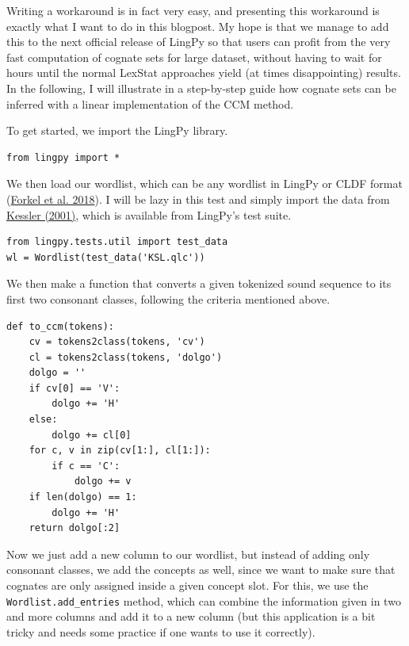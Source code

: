 \documentclass[
  a4paper,
  14pt,
  oneside,
  tablecaptionabove
]{scrbook}
\begin{document}
Writing a workaround is in fact very easy, and presenting this
workaround is exactly what I want to do in this blogpost. My hope is
that we manage to add this to the next official release of LingPy so
that users can profit from the very fast computation of cognate sets for
large dataset, without having to wait for hours until the normal LexStat
approaches yield (at times disappointing) results. In the following, I
will illustrate in a step-by-step guide how cognate sets can be inferred
with a linear implementation of the CCM method.

To get started, we import the LingPy library.

\begin{lstlisting}[basicstyle=\small]
from lingpy import *
\end{lstlisting}

We then load our wordlist, which can be any wordlist in LingPy or CLDF
format (\href{http://bibliography.lingpy.org?key=Forkel2018a}{Forkel et
al. 2018}). I will be lazy in this test and simply import the data from
\href{http://bibliography.lingpy.org?key=Kessler2001}{Kessler (2001)},
which is available from LingPy's test suite.

\begin{lstlisting}[basicstyle=\small]
from lingpy.tests.util import test_data
wl = Wordlist(test_data('KSL.qlc'))
\end{lstlisting}

We then make a function that converts a given tokenized sound sequence
to its first two consonant classes, following the criteria mentioned
above.

\begin{lstlisting}[basicstyle=\small]
def to_ccm(tokens):
    cv = tokens2class(tokens, 'cv')
    cl = tokens2class(tokens, 'dolgo')
    dolgo = ''
    if cv[0] == 'V': 
        dolgo += 'H'
    else:
        dolgo += cl[0]
    for c, v in zip(cv[1:], cl[1:]):
        if c == 'C':
            dolgo += v
    if len(dolgo) == 1:
        dolgo += 'H'
    return dolgo[:2]
\end{lstlisting}

Now we just add a new column to our wordlist, but instead of adding only
consonant classes, we add the concepts as well, since we want to make
sure that cognates are only assigned inside a given concept slot. For
this, we use the \lstinline!Wordlist.add_entries! method, which can
combine the information given in two and more columns and add it to a
new column (but this application is a bit tricky and needs some practice
if one wants to use it correctly).
\end{document}
